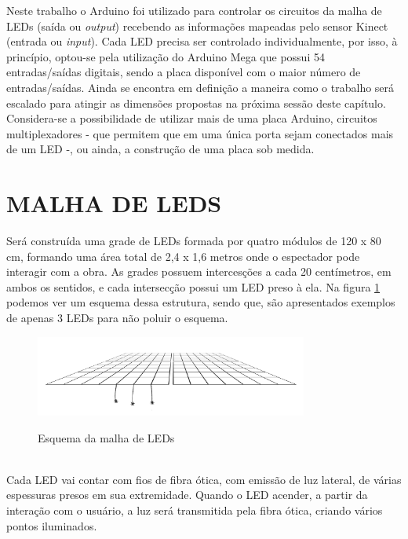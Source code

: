 Neste trabalho o Arduino foi utilizado para controlar os circuitos da malha de LEDs (saída ou \textit{output}) recebendo as informações mapeadas pelo sensor Kinect (entrada ou \textit{input}). Cada LED precisa ser controlado individualmente, por isso, à princípio, optou-se pela utilização do Arduino Mega que possui 54 entradas/saídas digitais, sendo a placa disponível com o maior número de entradas/saídas. Ainda se encontra em definição a maneira como o trabalho será escalado para atingir as dimensões propostas na próxima sessão deste capítulo. Considera-se a possibilidade de utilizar mais de uma placa Arduino, circuitos multiplexadores - que permitem que em uma única porta sejam conectados mais de um LED -, ou ainda, a construção de uma placa sob medida.

\section{MALHA DE LEDS}
\label{sec:malha}

Será construída uma grade de LEDs formada por quatro módulos de 120 x 80 cm, formando uma área total de 2,4 x 1,6 metros onde o espectador pode interagir com a obra. As grades possuem intercesções a cada 20 centímetros, em ambos os sentidos, e cada intersecção possui um LED preso à ela. Na figura \ref{fig:malha} podemos ver um esquema dessa estrutura, sendo que, são apresentados exemplos de apenas 3 LEDs para não poluir o esquema.

\begin{figure}[H]
    \centering
    \caption{Esquema da malha de LEDs}
	\vspace*{0,2cm}
    \includegraphics[width=0.8\textwidth]{./04-figuras/malha}
    \label{fig:malha}
\end{figure}
\vspace*{-0,9cm}
{\raggedright {}}\\

Cada LED vai contar com fios de fibra ótica, com emissão de luz lateral, de várias espessuras presos em sua extremidade. Quando o LED acender, a partir da interação com o usuário, a luz será transmitida pela fibra ótica, criando vários pontos iluminados.


   

